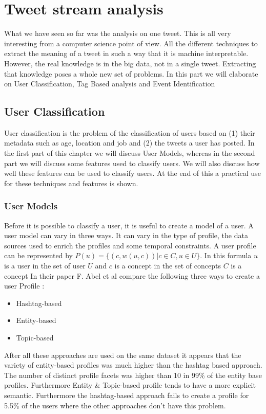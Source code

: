 \documentclass{article}
\begin{document}
\section{Tweet stream analysis}
What we have seen so far was the analysis on one tweet. This is all very interesting from a computer science point of view. All the different techniques to extract the meaning of a tweet in such a way that it is machine interpretable. However, the real knowledge is in the big data, not in a single tweet. Extracting that knowledge poses a whole new set of problems. In this part we will elaborate on User Classification, Tag Based analysis and Event Identification

\subsection{User Classification}
User classification is the problem of the classification of users based on (1) their metadata such as age, location and job and (2) the tweets a user has posted. In the first part of this chapter we will discuss User Models, whereas in the second part we will discuss some features used to classify users. We will also discuss how well these features can be used to classify users. At the end of this a practical use for these techniques and features is shown. 
\subsubsection{User Models}
Before it is possible to classify a user, it is useful to create a model of a user. A user model can vary in three ways. It can vary in the type of profile, the data sources used to enrich the profiles and some temporal constraints. A user profile can be represented by $P(u) = \{(c, w(u,c))| c \in C, u \in U\}$. In this formula $u$ is a user in the set of user $U$ and $c$ is a concept in the set of concepts $C$ is a concept In their paper F. Abel et al compare the following three ways to create a user Profile \cite{usermodel}:
\begin{itemize}
\item Hashtag-based
\item Entity-based
\item Topic-based
\end{itemize}
After all these approaches are used on the same dataset it appears that the variety of entity-based profiles was much higher than the hashtag based approach. The number of distinct profile facets was higher than 10 in 99\% of the entity base profiles. Furthermore Entity \& Topic-based profile tends to have a more explicit semantic.  \cite{usermodel} Furthermore the hashtag-based approach fails to create a profile for 5.5\% of the users where the other approaches don't have this problem. 
\end{document}
